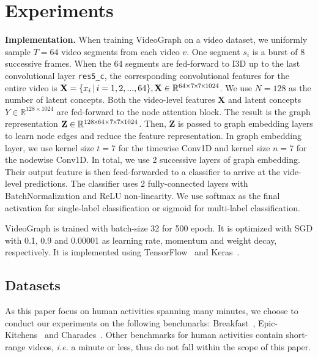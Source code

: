 \documentclass[10pt,twocolumn,letterpaper]{article}
\newcommand{\vbar}{\,|\,}
\newcommand{\partitle}[1]{\noindent\textbf{#1}}
\newcommand{\ptspace}{\vspace*{5pt}}
\begin{document}
\section{Experiments}\label{sec:experiments}
\ptspace
\partitle{Implementation.}
When training VideoGraph on a video dataset, we uniformly sample $T=64$ video segments from each video $v$.
One segment $s_i$ is a burst of $8$ successive frames.
When the $64$ segments are fed-forward to I3D up to the last convolutional layer \texttt{res5\_c}, the corresponding convolutional features for the entire video is $\textbf{X} = \{ x_i \vbar i = 1, 2, ..., 64 \}, \textbf{X} \in \mathbb{R}^{64 \times 7 \timesnarrow7 \timesnarrow 1024}$.
We use $N = 128$ as the number of latent concepts.
Both the video-level features $\textbf{X}$ and latent concepts $Y \in \mathbb{R}^{128 \times 1024}$ are fed-forward to the node attention block.
The result is the graph representation $ \mathbf{Z} \in \mathbb{R}^{128 {\mkern-2mu\times\mkern-2mu} 64 \times 7 {\mkern-2mu\times\mkern-2mu}7 {\mkern-2mu\times\mkern-2mu} 1024}$.
Then, $\mathbf{Z}$ is passed to graph embedding layers to learn node edges and reduce the feature representation.
In graph embedding layer, we use kernel size $t=7$ for the timewise Conv1D and kernel size $n=7$ for the nodewise Conv1D.
In total, we use 2 successive layers of graph embedding.
Their output feature is then feed-forwarded to a classifier to arrive at the vide-level predictions.
The classifier uses 2 fully-connected layers with BatchNormalization and ReLU non-linearity.
We use softmax as the final activation for single-label classification or sigmoid for multi-label classification.

VideoGraph is trained with batch-size 32 for 500 epoch.
It is optimized with SGD with 0.1, 0.9 and 0.00001 as learning rate, momentum and weight decay, respectively.
It is implemented using TensorFlow~\cite{tensorflow2015-whitepaper} and Keras~\cite{chollet2015keras}.

\subsection{Datasets}
As this paper focus on human activities spanning many minutes, we choose to conduct our experiments on the following benchmarks: Breakfast~\cite{kuehne2014language}, Epic-Kitchens~\cite{damen2018scaling} and Charades~\cite{sigurdsson2016hollywood}.
Other benchmarks for human activities contain short-range videos, \textit{i.e.} a minute or less, thus do not fall within the scope of this paper.
\end{document}
